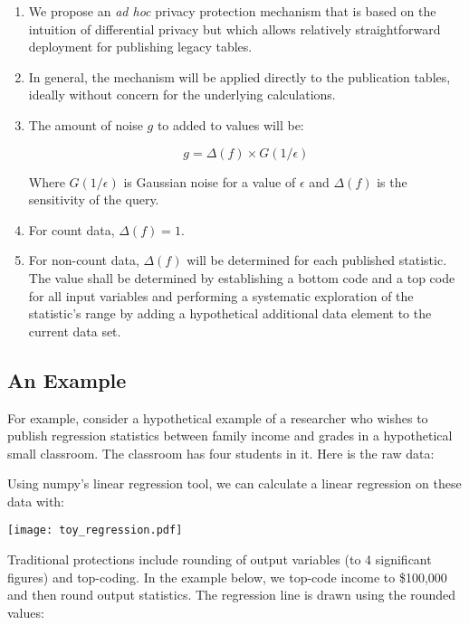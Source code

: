 \documentclass{article}
\begin{document}
\begin{enumerate}
\item We propose an \emph{ad hoc} privacy protection mechanism that is based on
the intuition of differential privacy but which allows relatively
straightforward deployment for publishing legacy tables.

\item In general, the mechanism will be applied directly to the
publication tables, ideally without concern for the underlying
calculations.

\item The amount of noise $g$ to added to values will be:

\begin{equation}
g = \Delta(f) \times G(1/\epsilon)
\end{equation}

Where $G(1/\epsilon)$ is Gaussian noise for a value of $\epsilon$ and
$\Delta(f)$ is the sensitivity of the query.

\item For count data, $\Delta(f)=1$. 

\item For non-count data, $\Delta(f)$ will be determined for each
  published statistic. The value shall be determined by establishing a
  bottom code 
  and a top code for all input variables and performing a
  systematic exploration of the statistic's range by adding a
  hypothetical additional data element to the current data set. 

\end{enumerate}

\subsection{An Example}

For example, consider a hypothetical example of a researcher who
wishes to publish regression statistics between family income and
grades in a hypothetical small classroom. The classroom has four
students in it. Here is the raw data:



Using numpy's linear regression tool, we can calculate a linear
regression on these data with:

\texttt{[image: toy\_regression.pdf]}

Traditional protections include rounding of output variables (to 4
significant figures) and top-coding. In the example below, we top-code
income to \$100,000 and then round output statistics. The regression
line is drawn using the rounded values:
\end{document}
